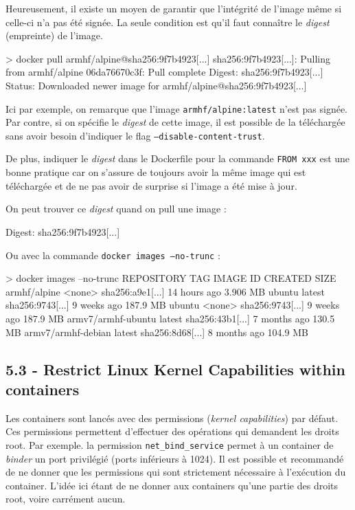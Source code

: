 \documentclass[11pt,a4paper,oneside]{report}
\newcommand{\code}[1]{\texttt{#1}}
\begin{document}
Heureusement, il existe un moyen de garantir que l'intégrité de l'image même si celle-ci n'a pas été signée. La seule condition est qu'il faut connaître le \textit{digest} (empreinte) de l'image.

\begin{textcode}
> docker pull armhf/alpine@sha256:9f7b4923[...]
sha256:9f7b4923[...]: Pulling from armhf/alpine
06da76670c3f: Pull complete 
Digest: sha256:9f7b4923[...]
Status: Downloaded newer image for armhf/alpine@sha256:9f7b4923[...]
\end{textcode}

Ici par exemple, on remarque que l'image \code{armhf/alpine:latest} n'est pas signée. Par contre, si on spécifie le \textit{digest} de cette image, il est possible de la téléchargée sans avoir besoin d'indiquer le flag \code{--disable-content-trust}.

De plus, indiquer le \textit{digest} dans le Dockerfile pour la commande \code{FROM xxx} est une bonne pratique car on s'assure de toujours avoir la même image qui est téléchargée et de ne pas avoir de surprise si l'image a été mise à jour.

On peut trouver ce \textit{digest} quand on pull une image :
\begin{textcode}
Digest: sha256:9f7b4923[...]
\end{textcode}

Ou avec la commande \code{docker images --no-trunc} :

\begin{textcode}
> docker images --no-trunc
REPOSITORY          TAG     IMAGE ID           CREATED        SIZE
armhf/alpine        <none>  sha256:a9e1[...]   14 hours ago   3.906 MB
ubuntu              latest  sha256:9743[...]   9 weeks ago    187.9 MB
ubuntu              <none>  sha256:9743[...]   9 weeks ago    187.9 MB
armv7/armhf-ubuntu  latest  sha256:43b1[...]   7 months ago   130.5 MB
armv7/armhf-debian  latest  sha256:8d68[...]   8 months ago   104.9 MB
\end{textcode}

\subsection{5.3  - Restrict Linux Kernel Capabilities within containers}\label{ss-restrict-kernel-capa}
Les containers sont lancés avec des permissions (\textit{kernel capabilities}) par défaut. Ces permissions permettent d'effectuer des opérations qui demandent les droits root. Par exemple. la permission \code{net\_bind\_service} permet à un container de \textit{binder} un port privilégié (ports inférieurs à 1024). Il est possible et recommandé de ne donner que les permissions qui sont strictement nécessaire à l'exécution du container. L'idée ici étant de ne donner aux containers qu'une partie des droits root, voire carrément aucun.
\end{document}

